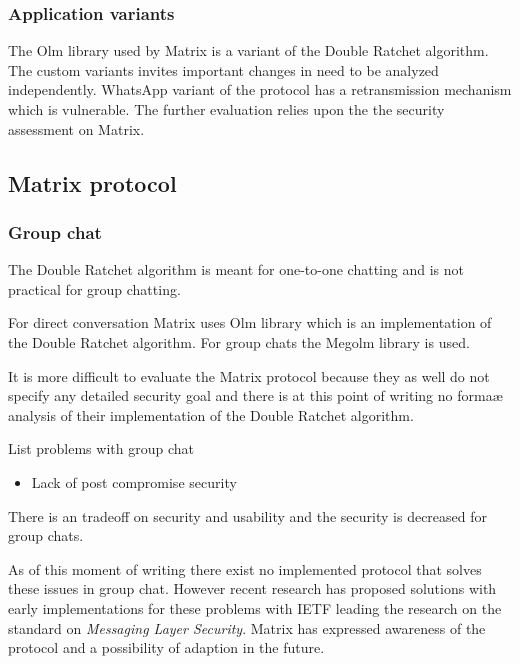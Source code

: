 \subsubsection{Application variants}

The Olm library used by Matrix is a variant of the Double Ratchet algorithm. The custom variants invites important changes in need to be analyzed independently. WhatsApp variant of the protocol has a retransmission mechanism which is vulnerable. 
The further evaluation relies upon the the security assessment on Matrix. 

\subsection{Matrix protocol}




\subsubsection{Group chat}
The Double Ratchet algorithm is meant for one-to-one chatting and is not practical for group chatting. %

For direct conversation Matrix uses Olm library which is an implementation of the Double Ratchet algorithm. For group chats the Megolm library is used. 

It is more difficult to evaluate the Matrix protocol because they as well do not specify any detailed security goal and there is at this point of writing no formaæ analysis of their implementation of the Double Ratchet algorithm.


List problems with group chat 

\begin{itemize}
	\item Lack of post compromise security
\end{itemize}

There is an tradeoff on security and usability and the security is decreased for group chats. %

As of this moment of writing there exist no implemented protocol that solves these issues in group chat. However recent research has proposed solutions with early implementations for these problems with IETF leading the research on the standard on \emph{Messaging Layer Security}. Matrix has expressed awareness of the protocol and a possibility of adaption in the future.

